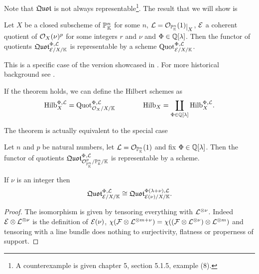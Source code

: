 Note that $\mathfrak{Quot}$ is not always representable\footnote{A counterexample is given chapter 5, section 5.1.5, example (8).}. The result that we will show is
\begin{theorem}\label{AltmanKelimanEasy}
Let $X$ be a closed subscheme of $\mathbb{P}^n_{\mathbb{K}}$ for some $n$, $\Lc=\Oc_{\Pj^n_\K}(1)\res X$, $\mathcal{E}$ a coherent quotient of $\mathcal{O}_{X}(\nu)^p$ for some integers $r$ and $\nu$ and $\Phi\in\mathbb{Q}[\lambda]$. Then the functor of quotients $\mathfrak{Quot}^{\Phi,\mathcal{L}}_{\mathcal{E}/X/\mathbb{K}}$ is representable by a scheme $\mathrm{Quot}^{\Phi,\mathcal{L}}_{\mathcal{E}/X/\mathbb{K}}$. 
\end{theorem}
This is a specific case of the version showcased in \cite{ALTMAN198050}. For more historical background see \cite{FGAEXPLAINED}.

\begin{remark}
If the theorem holds, we can define the Hilbert schemes as
\[\mathrm{Hilb}^{\Phi,\mathcal{L}}_{X}=\mathrm{Quot}^{\Phi,\mathcal{L}}_{\mathcal{O}_{X}/X/\mathbb{K}}\qquad\qquad \mathrm{Hilb}_X=\coprod_{\Phi\in\mathbb{Q}[\lambda]}\mathrm{Hilb}^{\Phi,\mathcal{L}}_{X}.\]
\end{remark}

The theorem is actually equivalent to the special case
\begin{theorem}\label{AltmanKelimanEasier}
Let $n$ and $p$ be natural numbers, let $\mathcal{L}=\mathcal{O}_{\mathbb{P}^n_{\mathbb{K}}}(1)$ and fix $\Phi\in\mathbb{Q}[\lambda]$. Then the functor of quotients $\mathfrak{Quot}^{\Phi,\mathcal{L}}_{\mathcal{O}_{\mathbb{P}^n_{\mathbb{K}}}^p/\mathbb{P}^n_{\mathbb{K}}/\mathbb{K}}$ is representable by a scheme. 
\end{theorem}

\begin{lemma}\label{NoTwistLemma}
If $\nu$ is an integer then 
\[\mathfrak{Quot}^{\Phi,\mathcal{L}}_{\mathcal{E}/X/\mathbb{K}}\cong \mathfrak{Quot}^{\Phi(\lambda+\nu),\mathcal{L}}_{\mathcal{E}(\nu)/X/\mathbb{K}}.\]
\end{lemma}
\begin{proof}
The isomorphism is given by tensoring everything with $\mathcal{L}^{\otimes \nu}$. Indeed $\mathcal{E}\otimes \mathcal{L}^{\otimes \nu}$ is the definition of $\mathcal{E}(\nu)$, $\chi(\mathcal{F}\otimes \mathcal{L}^{\otimes m+\nu})=\chi((\mathcal{F}\otimes\mathcal{L}^{\otimes \nu})\otimes \mathcal{L}^{\otimes m})$ and tensoring with a line bundle does nothing to surjectivity, flatness or properness of support.
\end{proof}

